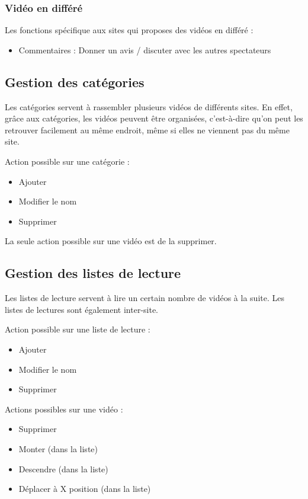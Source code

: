 \documentclass[11pt]{report} %
\begin{document}
			\subsubsection{Vidéo en différé}
			Les fonctions spécifique aux sites qui proposes des vidéos en différé :
			\begin{itemize}
				\item Commentaires : Donner un avis / discuter avec les autres spectateurs
			\end{itemize}
	
		\subsection{Gestion des catégories}
		Les catégories servent à rassembler plusieurs vidéos de différents sites. En effet, grâce aux catégories, les vidéos peuvent être organisées, c'est-à-dire qu'on peut les retrouver facilement au même endroit, même si elles ne viennent pas du même site.
		
		Action possible sur une catégorie :
		\begin{itemize}
			\item Ajouter
			\item Modifier le nom
			\item Supprimer
		\end{itemize}
		
		La seule action possible sur une vidéo est de la supprimer.
		
		\subsection{Gestion des listes de lecture}
		Les listes de lecture servent à lire un certain nombre de vidéos à la suite. Les listes de lectures sont également inter-site.
		
		Action possible sur une liste de lecture :
		\begin{itemize}
			\item Ajouter
			\item Modifier le nom
			\item Supprimer
		\end{itemize}
		
		Actions possibles sur une vidéo :
		\begin{itemize}
			\item Supprimer
			\item Monter (dans la liste)
			\item Descendre (dans la liste)
			\item Déplacer à X position (dans la liste)
		\end{itemize}
		
\end{document}
